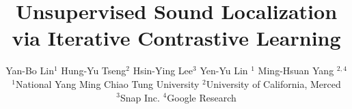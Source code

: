 \documentclass[final]{cvpr}
\begin{document}
\title{Unsupervised Sound Localization via Iterative Contrastive Learning}
 

\author{
Yan-Bo Lin$^{1}$\quad
Hung-Yu Tseng$^{2}$\quad
Hsin-Ying Lee$^{3}$\quad
Yen-Yu Lin $^{1}$\quad
Ming-Hsuan Yang $^{2,4}$
\\
$^{1}$National Yang Ming Chiao Tung University\quad
$^{2}$University of California, Merced\quad \\
$^{3}$Snap Inc. \quad
$^{4}$Google Research\\
}

\maketitle









\clearpage
{\small
% 

}
\end{document}
